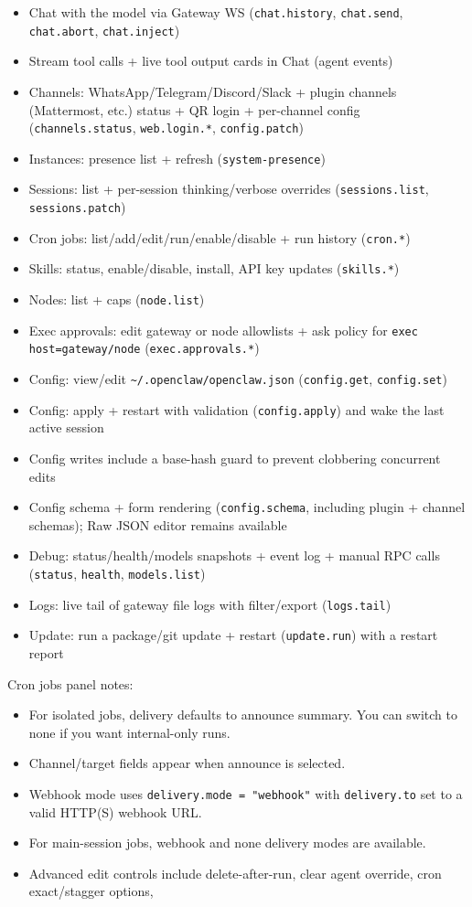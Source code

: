 \begin{itemize}
  \item Chat with the model via Gateway WS (\texttt{chat.history}, \texttt{chat.send}, \texttt{chat.abort}, \texttt{chat.inject})
  \item Stream tool calls + live tool output cards in Chat (agent events)
  \item Channels: WhatsApp/Telegram/Discord/Slack + plugin channels (Mattermost, etc.) status + QR login + per-channel config (\texttt{channels.status}, \texttt{web.login.*}, \texttt{config.patch})
  \item Instances: presence list + refresh (\texttt{system-presence})
  \item Sessions: list + per-session thinking/verbose overrides (\texttt{sessions.list}, \texttt{sessions.patch})
  \item Cron jobs: list/add/edit/run/enable/disable + run history (\texttt{cron.*})
  \item Skills: status, enable/disable, install, API key updates (\texttt{skills.*})
  \item Nodes: list + caps (\texttt{node.list})
  \item Exec approvals: edit gateway or node allowlists + ask policy for \texttt{exec host=gateway/node} (\texttt{exec.approvals.*})
  \item Config: view/edit \texttt{\textasciitilde{}/.openclaw/openclaw.json} (\texttt{config.get}, \texttt{config.set})
  \item Config: apply + restart with validation (\texttt{config.apply}) and wake the last active session
  \item Config writes include a base-hash guard to prevent clobbering concurrent edits
  \item Config schema + form rendering (\texttt{config.schema}, including plugin + channel schemas); Raw JSON editor remains available
  \item Debug: status/health/models snapshots + event log + manual RPC calls (\texttt{status}, \texttt{health}, \texttt{models.list})
  \item Logs: live tail of gateway file logs with filter/export (\texttt{logs.tail})
  \item Update: run a package/git update + restart (\texttt{update.run}) with a restart report
\end{itemize}


Cron jobs panel notes:

\begin{itemize}
  \item For isolated jobs, delivery defaults to announce summary. You can switch to none if you want internal-only runs.
  \item Channel/target fields appear when announce is selected.
  \item Webhook mode uses \texttt{delivery.mode = "webhook"} with \texttt{delivery.to} set to a valid HTTP(S) webhook URL.
  \item For main-session jobs, webhook and none delivery modes are available.
  \item Advanced edit controls include delete-after-run, clear agent override, cron exact/stagger options,
\end{itemize}

